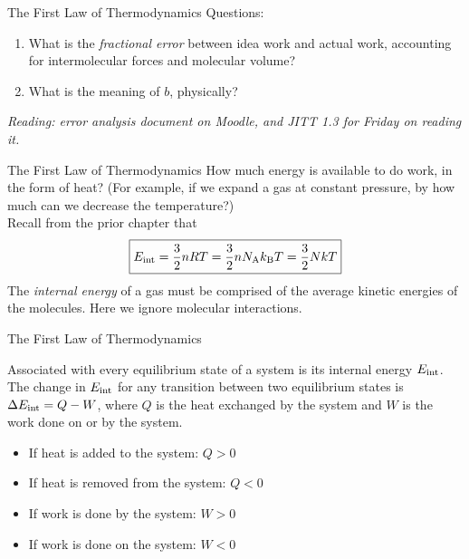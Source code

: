 \documentclass{beamer}
\begin{document}
\begin{frame}{The First Law of Thermodynamics}
Questions:
\begin{enumerate}
\item What is the \textit{fractional error} between idea work and actual work, accounting for intermolecular forces and molecular volume?
\item What is the meaning of $b$, physically?
\end{enumerate}
\textit{Reading: error analysis document on Moodle, and JITT 1.3 for Friday on reading it.}
\end{frame}

\begin{frame}{The First Law of Thermodynamics}
How much energy is available to do work, in the form of heat?  (For example, if we expand a gas at constant pressure, by how much can we decrease the temperature?) \\ \vspace{0.5cm}
Recall from the prior chapter that 
\begin{equation}
\boxed{
E_{\rm int} = \frac{3}{2}nRT = \frac{3}{2}nN_{\rm A}k_{\rm B}T = \frac{3}{2}NkT}
\label{eq:internal}
\end{equation}
The \textit{internal energy} of a gas must be comprised of the average kinetic energies of the molecules.  Here we ignore molecular interactions.
\end{frame}

\begin{frame}{The First Law of Thermodynamics}
\begin{tcolorbox}[colback=white,colframe=red!40!blue,title=The First Law of Thermodynamics]
\alert{Associated with every equilibrium state of a system is its internal energy $E_{\rm int}$.  The change in $E_{\rm int}$ for any transition between two equilibrium states is $\Delta E_{\rm int} = Q-W$, where $Q$ is the heat exchanged by the system and $W$ is the work done on or by the system.}
\end{tcolorbox}
\begin{itemize}
\item If heat is added to the system: $Q>0$
\item If heat is removed from the system: $Q<0$
\item If work is done by the system: $W>0$
\item If work is done on the system: $W<0$
\end{itemize}
\end{frame}
\end{document}
